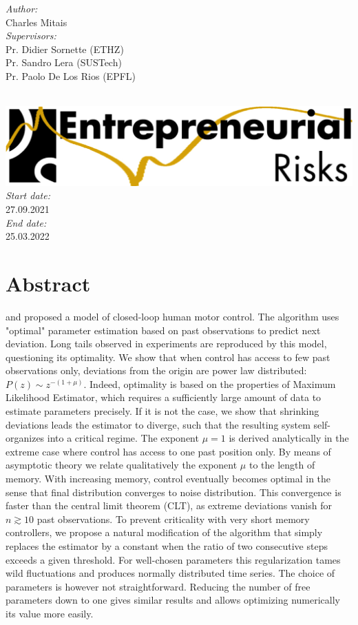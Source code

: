 \documentclass[a4paper, 11pt]{report}
\begin{document}
\begin{titlepage}
\centering
\begin{minipage}{0.4\textwidth}
\centering
\emph{Author:}\\
Charles Mitais \\ %
[1.2cm]
\emph{Supervisors:} \\
Pr. Didier Sornette (ETHZ)\\
Pr. Sandro Lera (SUSTech)\\
Pr. Paolo De Los Rios (EPFL)
\end{minipage}\\[1.3cm]	
\includegraphics[width=.5\textwidth]{logo-chair}	\\
[1.5cm]
\emph{Start date: } \\
27.09.2021\\[.2cm]
\emph{End date: } \\
25.03.2022\\
\end{titlepage}




\chapter*{Abstract}
\citet{OptCont} and \citet{FrontNanoScience} proposed a model of closed-loop human motor control. The algorithm uses "optimal" parameter estimation based on past observations to predict next deviation. Long tails observed in experiments are reproduced by this model, questioning its optimality. We show that when control has access to few past observations only, deviations from the origin are power law distributed: $P(z)\sim z^{-(1+\mu)}$. Indeed, optimality is based on the properties of Maximum Likelihood Estimator, which requires a sufficiently large amount of data to estimate parameters precisely. If it is not the case, we show that shrinking deviations leads the estimator to diverge, such that the resulting system self-organizes into a critical regime. The exponent $\mu=1$ is derived analytically in the extreme case where control has access to one past position only. By means of asymptotic theory we relate qualitatively the exponent $\mu$ to the length of memory. With increasing memory, control eventually becomes optimal in the sense that final distribution converges to noise distribution. This convergence is faster than the central limit theorem (CLT), as extreme deviations vanish for $n\gtrsim 10$ past observations. To prevent criticality with very short memory controllers, we propose a natural modification of the algorithm that simply replaces the estimator by a constant when the ratio of two consecutive steps exceeds a given threshold. For well-chosen parameters this regularization tames wild fluctuations and produces normally distributed time series. The choice of parameters is however not straightforward. Reducing the number of free parameters down to one gives similar results and allows optimizing numerically its value more easily.
\end{document}
